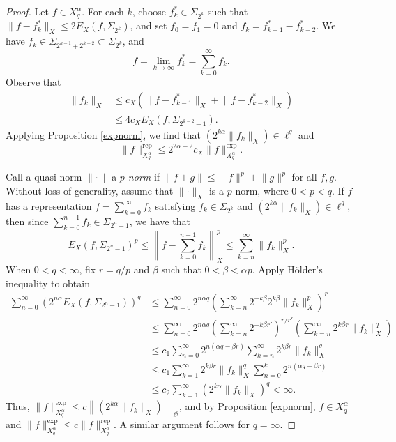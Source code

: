 \documentclass{article}
\theoremstyle{definition}
\theoremstyle{remark}
\begin{document}
\begin{proof}
    Let $f \in X_q^\alpha$. For each $k$, choose $f_k^* \in \Sigma_{2^k}$ such that $\lVert f-f_k^* \rVert_X \leq 2E_X(f,\Sigma_{2^k})$, and set $f_0 = f_1 =0$ and $f_k = f_{k-1}^*-f_{k-2}^*$. We have $f_k \in \Sigma_{2^{k-1}+2^{k-2}} \subset \Sigma_{2^k}$, and
    \[f = \lim_{k \to \infty} f_k^* = \sum_{k=0}^\infty f_k.\]
    Observe that
    \begin{align*}
        \lVert f_k \rVert_X &\leq c_X(\lVert f-f_{k-1}^* \rVert_X + \lVert f-f_{k-2}^* \rVert_X) \\
        &\leq 4c_X E_X(f,\Sigma_{2^{k-2}-1}).
    \end{align*}
    Applying Proposition \ref{expnorm}, we find that $\left( 2^{k\alpha} \lVert f_k \rVert_X \right) \in \ell^q$ and
    \[\lVert f \rVert_{X_q^\alpha}^\mathrm{rep} \leq 2^{2\alpha+2}c_X \lVert f \rVert_{X_q^\alpha}^\mathrm{exp}.\]

    Call a quasi-norm $\lVert \cdot \rVert$ a $p$\textit{-norm} if $\lVert f+g \rVert \leq \lVert f \rVert^p + \lVert g \rVert^p$ for all $f,g$. Without loss of generality, assume that $\lVert \cdot \rVert_X$ is a $p$-norm, where $0 < p < q$. If $f$ has a representation $f = \sum_{k=0}^\infty f_k$ satisfying $f_k \in \Sigma_{2^k}$ and $\left( 2^{k\alpha} \lVert f_k \rVert_X \right) \in \ell^q$, then since $\sum_{k=0}^{n-1} f_k \in \Sigma_{2^n-1}$, we have that
    \[E_X(f,\Sigma_{2^n-1})^p \leq \left\lVert f - \sum_{k=0}^{n-1} f_k \right\rVert_X^p \leq \sum_{k=n}^{\infty} \lVert f_k \rVert_X^p.\]
    When $0 < q < \infty$, fix $r = q/p$ and $\beta$ such that $0 < \beta < \alpha p$. Apply H{\"o}lder's inequality to obtain
    \begin{align*}
        \sum_{n=0}^\infty (2^{n\alpha}E_X(f,\Sigma_{2^n-1}))^q &\leq \sum_{n=0}^\infty 2^{n\alpha q}\left( \sum_{k=n}^{\infty} 2^{-k\beta}2^{k\beta}\lVert f_k \rVert_X^p \right)^r \\
        &\leq \sum_{n=0}^\infty 2^{n\alpha q}\left( \sum_{k=n}^{\infty} 2^{-k\beta r'} \right)^{r/r'} \left( \sum_{k=n}^{\infty} 2^{k\beta r}\lVert f_k \rVert_X^q \right) \\
        &\leq c_1\sum_{n=0}^\infty 2^{n(\alpha q - \beta r)}\sum_{k=n}^{\infty} 2^{k\beta r}\lVert f_k \rVert_X^q \\
        &\leq c_1\sum_{k=1}^{\infty} 2^{k\beta r}\lVert f_k \rVert_X^q \sum_{n=0}^k 2^{n(\alpha q - \beta r)} \\
        &\leq c_2\sum_{k=1}^{\infty} (2^{k\alpha}\lVert f_k \rVert_X)^q < \infty.
    \end{align*}
    Thus, $\lVert f \rVert_{X_q^\alpha}^\mathrm{exp} \leq c\left\lVert \left( 2^{k\alpha} \lVert f_k \rVert_X \right) \right\rVert_{\ell^q}$, and by Proposition \ref{expnorm}, $f \in X_q^\alpha$ and $\lVert f \rVert_{X_q^\alpha}^\mathrm{exp} \leq c\lVert f \rVert_{X_q^\alpha}^\mathrm{rep}$. A similar argument follows for $q = \infty$.
\end{proof}
\end{document}
